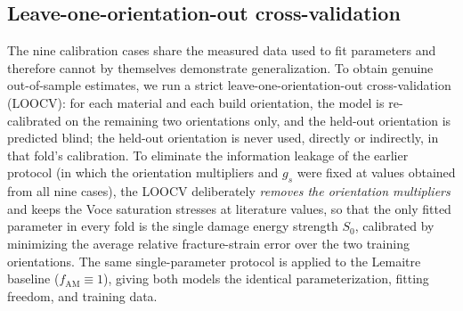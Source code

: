 \documentclass[12pt,a4paper,twocolumn]{article}
\begin{document}
\subsection{Leave-one-orientation-out cross-validation}
\label{sec:loocv}

The nine calibration cases share the measured data used to fit parameters and therefore cannot by themselves demonstrate generalization. To obtain genuine out-of-sample estimates, we run a strict leave-one-orientation-out cross-validation (LOOCV): for each material and each build orientation, the model is re-calibrated on the remaining two orientations only, and the held-out orientation is predicted blind; the held-out orientation is never used, directly or indirectly, in that fold's calibration. To eliminate the information leakage of the earlier protocol (in which the orientation multipliers and $g_s$ were fixed at values obtained from all nine cases), the LOOCV deliberately \emph{removes the orientation multipliers} and keeps the Voce saturation stresses at literature values, so that the only fitted parameter in every fold is the single damage energy strength $S_0$, calibrated by minimizing the average relative fracture-strain error over the two training orientations. The same single-parameter protocol is applied to the Lemaitre baseline ($f_{\mathrm{AM}} \equiv 1$), giving both models the identical parameterization, fitting freedom, and training data.
\end{document}
